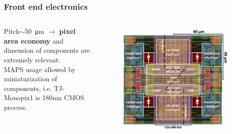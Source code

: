     \begin{frame}
        \frametitle{Front end electronics}
            \begin{columns}
                Pitch$\sim$\SI{50}{\um} $\rightarrow$ \textbf{pixel area economy} and dimension of components are extremely relevant. \\\smallskip
                MAPS usage allowed by miniaturization of components, i.e. TJ-Monopix1 is 180{nm} CMOS process.\\
                    \begin{figure}[h!]
                        \vspace*{-0.9cm}\hspace*{-0.9cm}
                        \includegraphics[width=1.1\linewidth]{figures/Monopix1/Monopix1_2x2pixelsgroup.png}
                    \end{figure}
            \end{columns}


\end{frame}
